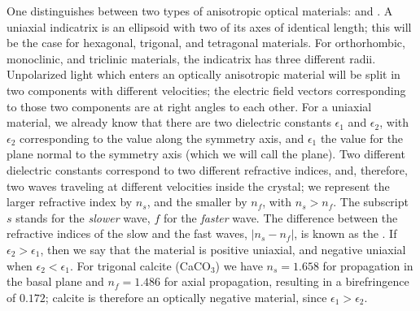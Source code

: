 One distinguishes between two types of anisotropic optical materials:  and .  A uniaxial indicatrix is an ellipsoid with two of its axes of identical length; this will be the case for hexagonal, trigonal, and tetragonal materials.  For orthorhombic, monoclinic, and triclinic materials, the indicatrix has three different radii.  Unpolarized light which enters an optically anisotropic material will be split in two components with different velocities; the electric field vectors corresponding to those two components are at right angles to each other.  For a uniaxial material, we already know that there are two dielectric constants $\epsilon_1$ and $\epsilon_2$, with $\epsilon_2$ corresponding to the value along the symmetry axis, and $\epsilon_1$ the value for the plane normal to the symmetry axis (which we will call the  plane).  Two different dielectric constants correspond to two different refractive indices, and, therefore, two waves traveling at different velocities inside the crystal;  we represent the larger refractive index by $n_s$, and the smaller by $n_f$, with $n_s>n_f$.  The subscript $s$ stands for the \textit{slower} wave, $f$ for the \textit{faster} wave. The difference between the refractive indices of the slow and the fast waves, $\vert n_s-n_f\vert$, is known as the .  If $\epsilon_2>\epsilon_1$, then we say that the material is positive uniaxial, and negative uniaxial when $\epsilon_2<\epsilon_1$.  For trigonal calcite (CaCO$_3$) we have $n_s=1.658$ for propagation in the basal plane and $n_f=1.486$ for axial propagation, resulting in a birefringence of $0.172$; calcite is therefore an optically negative material, since $\epsilon_1>\epsilon_2$.


